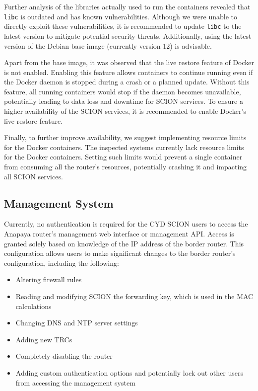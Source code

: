 Further analysis of the libraries actually used to run the containers revealed that \texttt{libc} is outdated and has known vulnerabilities.
Although we were unable to directly exploit these vulnerabilities, it is recommended to update \texttt{libc} to the latest version to mitigate potential security threats.
Additionally, using the latest version of the Debian base image (currently version 12) is advisable.

Apart from the base image, it was observed that the live restore feature of Docker is not enabled.
Enabling this feature allows containers to continue running even if the Docker daemon is stopped during a crash or a planned update.
Without this feature, all running containers would stop if the daemon becomes unavailable, potentially leading to data loss and downtime for SCION services.
To ensure a higher availability of the SCION services, it is recommended to enable Docker's live restore feature.

Finally, to further improve availability, we suggest implementing resource limits for the Docker containers.
The inspected systems currently lack resource limits for the Docker containers.
Setting such limits would prevent a single container from consuming all the router's resources, potentially crashing it and impacting all SCION services.



\subsection{Management System}
\label{sec:management-system}
Currently, no authentication is required for the CYD SCION users to access the Anapaya router's management web interface or management API.
Access is granted solely based on knowledge of the IP address of the border router.
This configuration allows users to make significant changes to the border router's configuration, including the following:

\begin{itemize}
    \item Altering firewall rules
    \item Reading and modifying SCION the forwarding key, which is used in the MAC calculations
    \item Changing DNS and NTP server settings
    \item Adding new TRCs
    \item Completely disabling the router
    \item Adding custom authentication options and potentially lock out other users from accessing the management system
\end{itemize}

